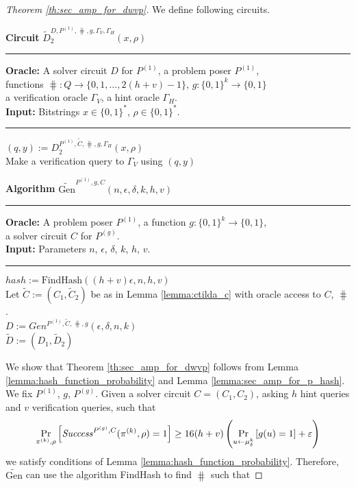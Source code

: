 %
\begin{proof}[Theorem \ref{th:sec_amp_for_dwvp}]
We define following circuits.
%
\begin{codeblock}
  \textbf{Circuit} $\widetilde{D}_2^{D, P^{(1)}, \hash, g, \Gamma_V, \Gamma_H}(x, \rho)$
  \medskip
  \hrule
  \medskip
  \textbf{Oracle:} A solver circuit $D$ for $P^{(1)}$, a problem poser $P^{(1)}$, \\
  \IndII functions $\hash: Q \rightarrow \{0,1, \dots, 2(h+v) - 1\}$, $g: \{0,1\}^{k} \rightarrow \{0,1\}$ \\
  \IndII a verification oracle $\Gamma_V$, a hint oracle $\Gamma_H$.\\
  \textbf{Input:}  Bitstrings $x \in \{0,1\}^{*}$, $\rho \in \{0,1\}^{*}$.
  \medskip\hrule\medskip
  $(q, y) := D_2^{P^{(1)}, \widetilde{C}, \hash, g, \Gamma_H}(x, \rho)$ \\
  Make a verification query to $\Gamma_V$ using $(q,y)$
\end{codeblock}
%
\begin{codeblock}
  \textbf{Algorithm} $\widetilde{\text{Gen}}^{P^{(1)}, g, C}(n, \epsilon, \delta, k, h, v)$
  \medskip \hrule \medskip
  \textbf{Oracle:} A problem poser $P^{(1)}$, a function $g: \{0,1\}^{k} \rightarrow \{0,1\}$, \\
  \IndII a solver circuit $C$ for $P^{(g)}$.  \\
  \textbf{Input:} Parameters $n$, $\epsilon$, $\delta$, $k$, $h$, $v$.
  \medskip\hrule\medskip
  $hash := \text{FindHash}((h+v)\epsilon, n, h, v)$ \\
  Let $\widetilde{C} := (C_1, \widetilde{C}_2)$ be as in Lemma \ref{lemma:ctilda_c} with oracle access to $C$, $\hash$. \\
  $D := Gen^{P^{(1)},  \widetilde{C}, \hash, g}(\epsilon, \delta, n, k)$ \\
  \Return $\widetilde{D} := (D_1, \widetilde{D}_2)$
\end{codeblock}
%
We show that Theorem \ref{th:sec_amp_for_dwvp} follows from Lemma \ref{lemma:hash_function_probability} and Lemma \ref{lemma:sec_amp_for_p_hash}.
We fix $P^{(1)}$, $g$, $P^{(g)}$. Given a solver circuit $C = (C_1, C_2)$, asking $h$ hint queries and $v$ verification queries, such that
\begin{align*}
    \underset{\pi^{(k)}, \rho}{\Pr}\left[\operatorname{\mathit{Success}}^{P^{(g)}, C}(\pi^{(k)}, \rho) = 1\right] \geq 16(h+v)\left(\underset{u \leftarrow \mu_\delta^k}{\Pr}\left[g(u) = 1\right] + \varepsilon\right)
\end{align*}
we satisfy conditions of Lemma \ref{lemma:hash_function_probability}. Therefore, $\widetilde{\text{Gen}}$ can use the algorithm FindHash to find $\hash$ such that

\end{proof}
